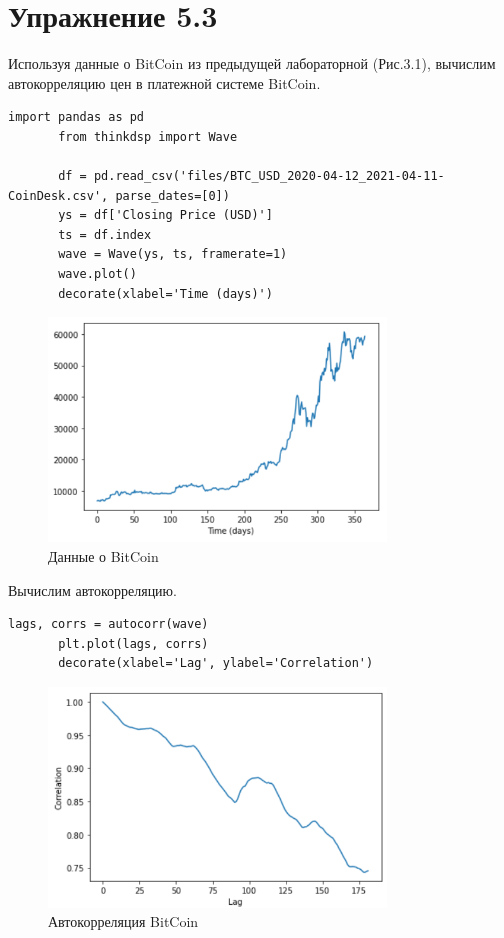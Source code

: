 \documentclass[a4paper,12pt]{report}
\begin{document}
\chapter{Упражнение 5.3}
    Используя данные о BitCoin из предыдущей лабораторной (Рис.3.1), вычислим автокорреляцию цен в платежной системе BitCoin.
\begin{lstlisting}[caption=Получение данных о BitCoin]
       import pandas as pd
       from thinkdsp import Wave

       df = pd.read_csv('files/BTC_USD_2020-04-12_2021-04-11-CoinDesk.csv', parse_dates=[0])
       ys = df['Closing Price (USD)']
       ts = df.index
       wave = Wave(ys, ts, framerate=1)
       wave.plot()
       decorate(xlabel='Time (days)')
\end{lstlisting}
\begin{figure}[H]
        \centering
        \includegraphics[width=0.8\textwidth]{fig3-1.PNG}
        \caption{Данные о BitCoin}
        \label{fig:fig3-1}
\end{figure} 
    
    Вычислим автокорреляцию.
\begin{lstlisting}[caption=Вычисление автокорреляции]
       lags, corrs = autocorr(wave)
       plt.plot(lags, corrs)
       decorate(xlabel='Lag', ylabel='Correlation')
\end{lstlisting}
\begin{figure}[H]
        \centering
        \includegraphics[width=0.8\textwidth]{fig3-2.PNG}
        \caption{Автокорреляция BitCoin}
        \label{fig:fig3-2}
\end{figure} 
     
\end{document}
